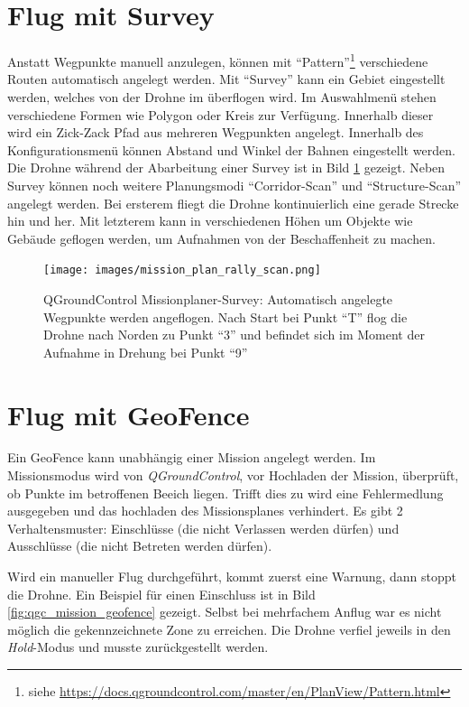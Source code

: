 \section{Flug mit Survey}
Anstatt Wegpunkte manuell anzulegen, können mit \enquote{Pattern}\footnote{siehe \url{https://docs.qgroundcontrol.com/master/en/PlanView/Pattern.html}} verschiedene Routen automatisch angelegt werden. Mit \enquote{Survey} kann ein Gebiet eingestellt werden, welches von der Drohne im überflogen wird. Im Auswahlmenü stehen verschiedene Formen wie Polygon oder Kreis zur Verfügung. Innerhalb dieser wird ein Zick-Zack Pfad aus mehreren Wegpunkten angelegt. Innerhalb des Konfigurationsmenü können Abstand und Winkel der Bahnen eingestellt werden. Die Drohne während der Abarbeitung einer Survey ist in Bild \ref{fig:qgc_mission_plan_surv} gezeigt. Neben Survey können noch weitere Planungsmodi \enquote{Corridor-Scan} und \enquote{Structure-Scan} angelegt werden. Bei ersterem fliegt die Drohne kontinuierlich eine gerade Strecke hin und her. Mit letzterem kann in verschiedenen Höhen um Objekte wie Gebäude geflogen werden, um Aufnahmen von der Beschaffenheit zu machen.

\begin{figure}[h]
    \centering
    \texttt{[image: images/mission\_plan\_rally\_scan.png]}
    \caption[QGroundControl Missionplaner-Survey]{QGroundControl Missionplaner-Survey: Automatisch angelegte Wegpunkte werden angeflogen. Nach Start bei Punkt \enquote{T} flog die Drohne nach Norden zu Punkt \enquote{3} und befindet sich im Moment der Aufnahme in Drehung bei Punkt \enquote{9}}
    \label{fig:qgc_mission_plan_surv}
\end{figure}

\section{Flug mit GeoFence}
Ein GeoFence kann unabhängig einer Mission angelegt werden. Im Missionsmodus wird von \textit{QGroundControl}, vor Hochladen der Mission, überprüft, ob Punkte im betroffenen Beeich liegen. Trifft dies zu wird eine Fehlermedlung ausgegeben und das hochladen des Missionsplanes verhindert. Es gibt 2 Verhaltensmuster: Einschlüsse (die nicht Verlassen werden dürfen) und Ausschlüsse (die nicht Betreten werden dürfen).

Wird ein manueller Flug durchgeführt, kommt zuerst eine Warnung, dann stoppt die Drohne. Ein Beispiel für einen Einschluss ist in Bild \ref{fig:qgc_mission_geofence} gezeigt. Selbst bei mehrfachem Anflug war es nicht möglich die gekennzeichnete Zone zu erreichen. Die Drohne verfiel jeweils in den \textit{Hold}-Modus und musste zurückgestellt werden. 

